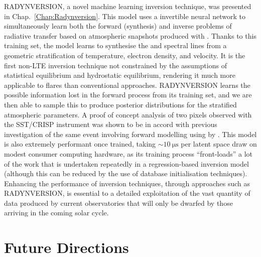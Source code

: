 RADYNVERSION, a novel machine learning inversion technique, was presented in Chap.~\ref{Chap:Radynversion}.
This model uses a invertible neural network to simultaneously learn both the forward (synthesis) and inverse problems of radiative transfer based on atmospheric snapshots produced with \Radyn{}.
Thanks to this training set, the model learns to synthesise the \Ha{} and \CaLine{} spectral lines from a geometric stratification of temperature, electron density, and velocity.
It is the first non-LTE inversion technique not constrained by the assumptions of statistical equilibrium and hydrostatic equilibrium, rendering it much more applicable to flares than conventional approaches.
RADYNVERSION learns the possible information lost in the forward process from its training set, and we are then able to sample this to produce posterior distributions for the stratified atmospheric parameters.
A proof of concept analysis of two pixels observed with the SST/CRISP instrument was shown to be in accord with previous investigation of the same event involving forward modelling using \Radyn{} by \citet{Kuridze2015}.
This model is also extremely performant once trained, taking $\sim\SI{10}{\micro\s}$ per latent space draw on modest consumer computing hardware, as its training process ``front-loads'' a lot of the work that is undertaken repeatedly in a regression-based inversion model (although this can be reduced by the use of database initialisation techniques).
Enhancing the performance of inversion techniques, through approaches such as RADYNVERSION, is essential to a detailed exploitation of the vast quantity of data produced by current observatories that will only be dwarfed by those arriving in the coming solar cycle.

\section*{Future Directions}

